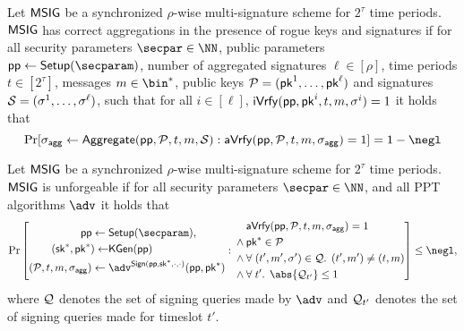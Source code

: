\begin{definition}
  Let $\mathsf{MSIG}$ be a synchronized $\rho$-wise multi-signature scheme for $2^\tau$ time periods.
  $\mathsf{MSIG}$ has correct aggregations in the presence of rogue keys and signatures if for all security parameters $\secpar\in\NN$, public parameters $\params\gets\setup(\secparam)$, number of aggregated signatures $\ell\in[\rho]$, time periods $t\in[2^\tau]$, messages $m\in\bin^*$, public keys $\mathcal{P} = (\mathsf{pk}^1,\dots,\mathsf{pk}^\ell)$ and signatures $\mathcal{S} = (\sigma^1,\dots,\sigma^\ell)$, such that for all $i\in[\ell]$, $\mathsf{iVrfy}(\mathsf{pp},\mathsf{pk}^i,t,m,\sigma^i) = 1$ it holds that
  \[
  \Pr[\aggsig\gets\aggregate(\params,\pubkeys,t,m,\signatures): \averify(\params,\pubkeys,t,m,\aggsig)=1]=1-\negl
  \]
\end{definition}

\begin{definition}[Unforgeability]\label{def:multisigunforge}
  Let $\mathsf{MSIG}$ be a synchronized $\rho$-wise multi-signature scheme for $2^\tau$ time periods.
  $\mathsf{MSIG}$ is unforgeable if for all security parameters $\secpar\in\NN$, and all PPT algorithms $\adv$ it holds that
\[
  \Pr\left[\begin{aligned}\params\gets{}&\setup(\secparam),\\ (\sk^*,\pk^*)\gets&\kgen(\params)\\(\pubkeys,t,m,\aggsig)\gets{}&\adv^{\sign(\params,\sk^*,\cdot,\cdot)}(\params,\pk^*)\end{aligned}: 
  \begin{aligned}
  &\averify(\params,\pubkeys,t,m,\aggsig)=1\\
  {}\land{}&\pk^*\in\pubkeys\\
  {}\land{}&\forall\; (t',m',\sigma') \in\queries\ldotp\; (t',m') \neq (t,m)\\
  {}\land{}&\forall\; t' \ldotp\;\abs{\queries_{t'}}\leq 1
  \end{aligned}\right] \leq \negl,
\]
where $\mathcal{Q}$ denotes the set of signing queries made by $\adv$ and $\mathcal{Q}_{t'}$ denotes the set of signing queries made for timeslot $t'$.
\end{definition}

